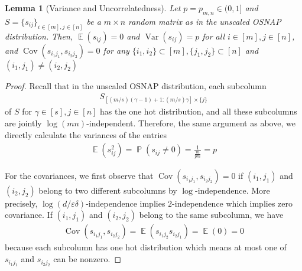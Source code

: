 \documentclass[11pt]{amsart}
\numberwithin{equation}{section}
\numberwithin{equation}{section}
\DeclareMathOperator{\E}{\mathbb{E}}
\DeclareMathOperator{\Pb}{\mathbb{P}}
\DeclareMathOperator{\cov}{Cov}
\newtheorem{lemma}[theorem]{Lemma}
\theoremstyle{remark}
\theoremstyle{definition}
\begin{document}
\begin{lemma}[Variance and Uncorrelatedness] \label{lem:osnapvaruncor}
Let $p = p_{m,n} \in (0,1]$ and $S=\{s_{ij}\}_{i \in [m], j \in [n]}$ be a $m \times n$ random matrix as in the unscaled OSNAP distribution. Then, $\E(s_{ij})=0$ and $\operatorname{Var}(s_{ij})=p$ for all $i \in [m], j \in [n]$, and $\cov(s_{i_1 j_1},s_{i_2 j_2})=0$ for any $\{i_1,i_2\} \subset [m], \{j_1,j_2\} \subset [n]$ and $ (i_1,j_1)\neq (i_2,j_2) $
\end{lemma}
\begin{proof}

Recall that in the unscaled OSNAP distribution, each subcolumn \begin{align*}S_{[(m/s)(\gamma-1)+1:(m/s)\gamma]\times\{ j\}}\end{align*} of $S$ for $\gamma\in [s], j \in [n]$ has the one hot distribution, and all these subcolumns are jointly $\log(mn)$-independent. Therefore, the same argument as above, we directly calculate the variances of the entries
\begin{align*}
    \E (s_{ij}^2) = \Pb(s_{ij} \neq 0) = \frac{1}{\frac{m}{pm}} = p
\end{align*}


For the covariances, we first observe that $\cov(s_{i_1 j_1}, s_{i_2 j_2})=0$ if $(i_1,j_1)$ and $(i_2,j_2)$ belong to two different subcolumns by $\log$-independence. More precisely, $\log(d/\varepsilon\delta)$-independence implies $2$-independence which implies zero covariance. If $(i_1,j_1)$ and $(i_2,j_2)$ belong to the same subcolumn, we have
\begin{align*}
    \cov(s_{i_1 j_1}, s_{i_2 j_2})=\E(s_{i_1 j_2}s_{i_2 j_1})=\E(0)=0
\end{align*}
because each subcolumn has one hot distribution which means at most one of $s_{i_1 j_1}$ and $s_{i_2 j_2}$ can be nonzero.
\end{proof}
\end{document}
